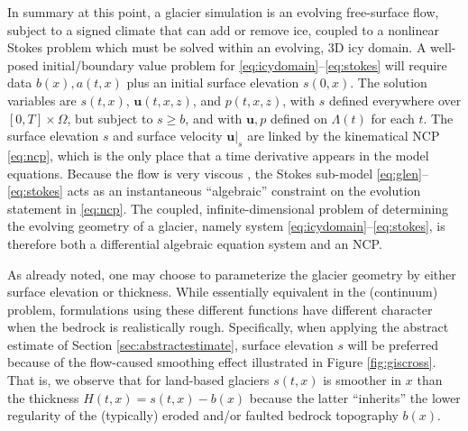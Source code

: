 \documentclass[hidelinks,onefignum,onetabnum,final]{siamart220329}  %
\newcommand{\bu}{\mathbf{u}}
\begin{document}
In summary at this point, a glacier simulation is an evolving free-surface flow, subject to a signed climate that can add or remove ice, coupled to a nonlinear Stokes problem which must be solved within an evolving, 3D icy domain.  A well-posed initial/boundary value problem for \eqref{eq:icydomain}--\eqref{eq:stokes} will require data $b(x),a(t,x)$ plus an initial surface elevation $s(0,x)$.  The solution variables are $s(t,x)$, $\bu(t,x,z)$, and $p(t,x,z)$, with $s$ defined everywhere over $[0,T]\times \Omega$, but subject to $s \ge b$, and with $\bu,p$ defined on $\Lambda(t)$ for each $t$.  The surface elevation $s$ and surface velocity $\bu|_s$ are linked by the kinematical NCP \eqref{eq:ncp}, which is the only place that a time derivative appears in the model equations.  Because the flow is very viscous \cite{Acheson1990}, the Stokes sub-model \eqref{eq:glen}--\eqref{eq:stokes} acts as an instantaneous ``algebraic'' constraint on the evolution statement in \eqref{eq:ncp}.  The coupled, infinite-dimensional problem of determining the evolving geometry of a glacier, namely system \eqref{eq:icydomain}--\eqref{eq:stokes}, is therefore both a differential algebraic equation system \cite{AscherPetzold1998,LofgrenAhlkronaHelanow2022} and an NCP.

As already noted, one may choose to parameterize the glacier geometry by either surface elevation or thickness.  While essentially equivalent in the (continuum) problem, formulations using these different functions have different character when the bedrock is realistically rough.  Specifically, when applying the abstract estimate of Section \ref{sec:abstractestimate}, surface elevation $s$ will be preferred because of the flow-caused smoothing effect illustrated in Figure \ref{fig:giscross}.  That is, we observe that for land-based glaciers $s(t,x)$ is smoother in $x$ than the thickness $H(t,x) = s(t,x)-b(x)$ because the latter ``inherits'' the lower regularity of the (typically) eroded and/or faulted bedrock topography $b(x)$.
\end{document}
